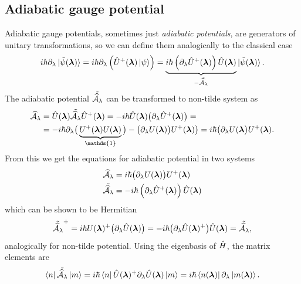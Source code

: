 \subsection{Adiabatic gauge potential}

Adiabatic gauge potentials, sometimes just \emph{adiabatic potentials}, are generators of unitary transformations, so we can define them analogically to the classical case
\begin{equation}
    i\hbar\partial_\lambda \ket{\tilde{\psi}(\llambda)} = i\hbar \partial_\lambda\left(\U^+(\llambda)\ket{\psi} \right)= \underbrace{i\hbar\left(\partial_\lambda \U^+(\llambda)\right)\U(\llambda)}_{-\tilde{\AA_\lambda}}\ket{\tilde{\psi}(\llambda)}.
\end{equation}
The adiabatic potential $\tilde{\AA_\lambda}$ can be transformed to non-tilde system as
\begin{equation}
    \begin{split}
        \AA_\lambda&=\U(\llambda)\tilde{\AA_\lambda}\U^+(\llambda) = -i\hbar\U(\llambda)\big(\partial_\lambda \U^+(\llambda)\big) =\\
        &= -i\hbar\partial_\lambda\big(\underbrace{U^+(\llambda)U(\llambda)}_{\mathds{1}}\big)-\big(\partial_\lambda U(\llambda)\big)U^+(\llambda) \big) =i\hbar \big(\partial_\lambda U(\llambda\big)U^+(\llambda).
    \end{split}
\end{equation}
From this we get the equations for adiabatic potential in two systems
\begin{align}
    \AA_\lambda&=i\hbar \big(\partial_\lambda U(\llambda)\big)U^+(\llambda)
    \label{eq:adiabaticPotential}\\
    \tilde{\AA_\lambda} &= -i\hbar\left(\partial_\lambda \U^+(\llambda)\right)\U(\llambda)
    \label{eq:adiabaticPotentialTilde}
\end{align}
which can be shown to be Hermitian
\begin{equation}
     \tilde{\AA_\lambda}^+=i\hbar U(\llambda)^+\big(\partial_\lambda\U(\llambda)\big)=-i\hbar\big(\partial_\lambda\U(\llambda)^+\big)\U(\llambda) = \tilde{\AA_\lambda},
     \label{eq:counterdiabaticPotentialTwoSystems}
\end{equation}
analogically for non-tilde potential.
Using the eigenbasis of $\HH$, the matrix elements are
\begin{equation}
    \bra{n}\tilde{\AA_\lambda}\ket{m}=i\hbar\bra{n}\U(\llambda)^+\partial_\lambda\U(\llambda)\ket{m} = i\hbar\bra{n(\llambda)}\partial_\lambda\ket{m(\llambda)}.
\end{equation}
